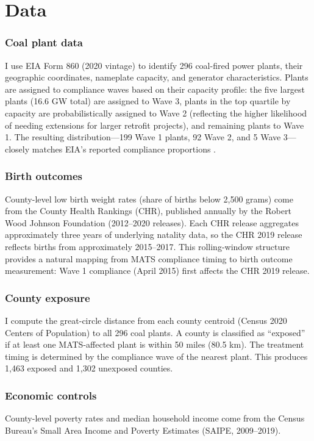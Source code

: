 \documentclass[12pt]{article}
\begin{document}
\section{Data}

\subsubsection*{Coal plant data} I use EIA Form 860 (2020 vintage) to identify 296 coal-fired power plants, their geographic coordinates, nameplate capacity, and generator characteristics. Plants are assigned to compliance waves based on their capacity profile: the five largest plants (16.6 GW total) are assigned to Wave 3, plants in the top quartile by capacity are probabilistically assigned to Wave 2 (reflecting the higher likelihood of needing extensions for larger retrofit projects), and remaining plants to Wave 1. The resulting distribution---199 Wave 1 plants, 92 Wave 2, and 5 Wave 3---closely matches EIA's reported compliance proportions \citep{eia2016mats}.

\subsubsection*{Birth outcomes} County-level low birth weight rates (share of births below 2,500 grams) come from the County Health Rankings (CHR), published annually by the Robert Wood Johnson Foundation (2012--2020 releases). Each CHR release aggregates approximately three years of underlying natality data, so the CHR 2019 release reflects births from approximately 2015--2017. This rolling-window structure provides a natural mapping from MATS compliance timing to birth outcome measurement: Wave 1 compliance (April 2015) first affects the CHR 2019 release.

\subsubsection*{County exposure} I compute the great-circle distance from each county centroid (Census 2020 Centers of Population) to all 296 coal plants. A county is classified as ``exposed'' if at least one MATS-affected plant is within 50 miles (80.5 km). The treatment timing is determined by the compliance wave of the nearest plant. This produces 1,463 exposed and 1,302 unexposed counties.

\subsubsection*{Economic controls} County-level poverty rates and median household income come from the Census Bureau's Small Area Income and Poverty Estimates (SAIPE, 2009--2019).
\end{document}
